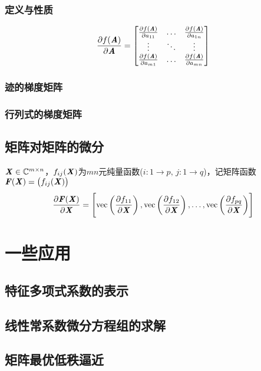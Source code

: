 \subsubsection{定义与性质}
\label{ssub:定义与性质}

\begin{definition}
    $$
    \frac{\partial f(\boldsymbol{\mathit{A}})}{\partial \boldsymbol{\mathit{A}}} = \begin{bmatrix}
        \frac{\partial f(\boldsymbol{\mathit{A}})}{\partial a_{11}}     &   \ldots  &   \frac{\partial f(\boldsymbol{\mathit{A}})}{\partial a_{1n}} \\
        \vdots                                      &   \ddots  &   \vdots                                  \\
        \frac{\partial f(\boldsymbol{\mathit{A}})}{\partial a_{m1}}     &   \ldots  &   \frac{\partial f(\boldsymbol{\mathit{A}})}{\partial a_{mn}}
    \end{bmatrix}
    $$
\end{definition}

\subsubsection{迹的梯度矩阵}
\label{ssub:迹的梯度矩阵}

\subsubsection{行列式的梯度矩阵}
\label{ssub:行列式的梯度矩阵}

\subsection{矩阵对矩阵的微分}
\label{sub:矩阵对矩阵的微分}

\begin{definition}[矩阵$\MF(\MX)$对$\MX$的微分]
    $\boldsymbol{\mathit{X}} \in \mathbb{C}^{m \times n}$，$f_{ij}(\boldsymbol{\mathit{X}})$为$mn$元纯量函数($i\colon 1 \to p,\, j\colon 1 \to q$)，记矩阵函数$\boldsymbol{\mathit{F}}(\boldsymbol{\mathit{X}}) = \left( f_{ij}(\boldsymbol{\mathit{X}}) \right)$
    $$
    \frac{\partial \boldsymbol{\mathit{F}}(\boldsymbol{\mathit{X}})}{\partial \boldsymbol{\mathit{X}}} = \left[ \mathrm{vec}\left(\frac{\partial f_{11}}{\partial \boldsymbol{\mathit{X}}}  \right), \mathrm{vec}\left(\frac{\partial f_{12}}{\partial \boldsymbol{\mathit{X}}}  \right), \ldots, \mathrm{vec}\left(\frac{\partial f_{pq}}{\partial \boldsymbol{\mathit{X}}}  \right)  \right]
    $$
\end{definition}

\section{一些应用}
\label{sec:一些应用}


\subsection{特征多项式系数的表示}
\label{sub:特征多项式系数的表示}

\subsection{线性常系数微分方程组的求解}
\label{sub:线性常系数微分方程组的求解}

\subsection{矩阵最优低秩逼近}
\label{sub:矩阵最优低秩逼近}

